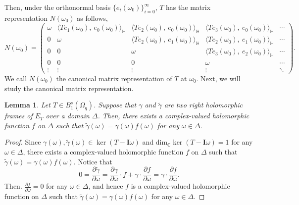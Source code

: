 \documentclass[pdflatex,sn-mathphys-num]{sn-jnl}%
\theoremstyle{thmstyleone}%
\theoremstyle{thmstyletwo}%
\theoremstyle{thmstylethree}%
\newtheorem{lemma}{Lemma}%
\newtheorem{lemma}[theorem]{Lemma}
\theoremstyle{definition}
\theoremstyle{remark}
\begin{document}
Then, under the orthonormal basis $\{e_i(\omega_0)\}_{i=0}^{\infty}$, $T$ has the matrix representation $N(\omega_0)$ as follows,
\[
   N(\omega_0)= \begin{pmatrix}
	\omega & \langle Te_1(\omega_0),\ e_0(\omega_0)\rangle_{\mathbb{H}} & \langle Te_2(\omega_0),\ e_0(\omega_0)\rangle_{\mathbb{H}} & \langle Te_3(\omega_0),\ e_0(\omega_0)\rangle_{\mathbb{H}} & \cdots \\
	0 & \omega & \langle Te_2(\omega_0),\ e_1(\omega_0)\rangle_{\mathbb{H}} & \langle Te_2(\omega_0),\ e_1(\omega_0)\rangle_{\mathbb{H}} & \cdots \\
	0 & 0 & \omega & \langle Te_3(\omega_0),\ e_2(\omega_0)\rangle_{\mathbb{H}} & \cdots \\
	0 &	0 & 0 & \omega & \cdots \\
	\vdots & \vdots & \vdots & \vdots & \ddots
\end{pmatrix}.
\]
We call $N(\omega_0)$ the canonical matrix representation of $T$ at $\omega_0$. Next, we will study the canonical matrix representation.

    \begin{lemma}\label{FR}
 Let $T\in B_1^{s}(\Omega_q)$. Suppose that $\gamma$ and $\widetilde{\gamma}$ are two right holomorphic  frames  of $E_T$ over a domain $\Delta$. Then, there exists a complex-valued holomorphic function $f$ on $\Delta$ such that $\widetilde{\gamma}(\omega)=\gamma(\omega)f(\omega)$ for any $\omega\in\Delta$.
    \end{lemma}
    \begin{proof}
   Since $\gamma(\omega),\widetilde{\gamma}(\omega)\in\ker(T-\boldsymbol{I}\omega)$ and $\textrm{dim}_{\mathbb{C}}\ker(T-\boldsymbol{I}\omega)=1$  for any $\omega\in\Delta$, there exists a complex-valued holomorphic function $f$ on $\Delta$ such that $\widetilde{\gamma}(\omega)=\gamma(\omega)f(\omega)$. Notice that
   \[
   0=\frac{\partial \widetilde{\gamma}}{\partial\overline{\omega}}=\frac{\partial \gamma}{\partial\overline{\omega}}\cdot f+ \gamma\cdot\frac{\partial f}{\partial\overline{\omega}}=\gamma\cdot\frac{\partial f}{\partial\overline{\omega}}.
   \]
    Then. $\frac{\partial f}{\partial\overline{\omega}}=0$ for any $\omega\in\Delta$, and hence $f$ is a complex-valued holomorphic function on $\Delta$ such that $\widetilde{\gamma}(\omega)=\gamma(\omega)f(\omega)$ for any $\omega\in\Delta$.
    \end{proof}
\end{document}
